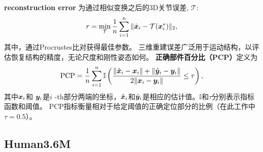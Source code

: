 \textbf{reconstruction error} 为通过相似变换之后的3D关节误差, $\mathcal{T}$:
\begin{align*}
r = \min_{\mathcal{T}}\frac{1}{n}\sum_{i=1}^n\|\hat{{\bm{x}}}_i-\mathcal{T}({\bm{x}}_i^*)\|_2,
\end{align*}
其中，通过Procrustes比对获得最佳参数。 三维重建误差广泛用于运动结构，以评估恢复结构的精度，无论尺度和刚性姿态如何。
\textbf{正确部件百分比（PCP）}定义为
\begin{align}\label{eq:pcp}
\mbox{PCP} = \frac{1}{n}\sum_{i=1}^n \mathbb{I}\left(\frac{\|\hat{{\bm{x}}}_i-{\bm{x}}_i\|+\|\hat{{\bm{y}}}_i-{\bm{y}}_i\|}{2\|{\bm{x}}_i-{\bm{y}}_i\|}\leq \tau\right),
\end{align}
其中${\bm{x}}_i$和 ${\bm{y}}_i$是$i$ -th部分两端的坐标，$\hat{{\bm{x}}}_i$和$\hat{{\bm{y}}}_i$是相应的估计值。$\mathbb{I}$和$\tau$分别表示指标函数和阈值。 PCP指标衡量相对于给定阈值的正确定位部分的比例（在此工作中$\tau=0.5$）。

\subsection{Human3.6M}
\label{sec:h36m}

